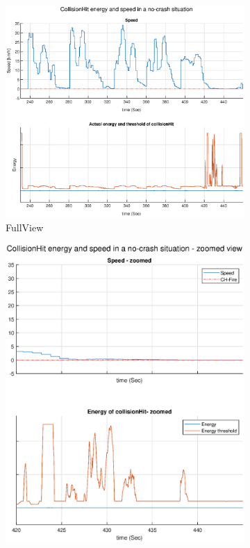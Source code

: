 \begin{figure}[H]
	\centering
	\begin{subfigure}{0.58\textwidth}
		\centering
		\includegraphics[width=\textwidth]{Bilder/CH_speed_CHEnergy_FullView_eps.eps}
		\caption{FullView}
		\label{fig:CH_speed_CHEnergy_FullView_eps}
	\end{subfigure}
	\hfill
	\begin{subfigure}{0.41\textwidth}
		\centering
		\includegraphics[width=\textwidth]{Bilder/CH_speed_CHEnergy_zoomed_eps.eps}

\end{subfigure}
\end{figure}
